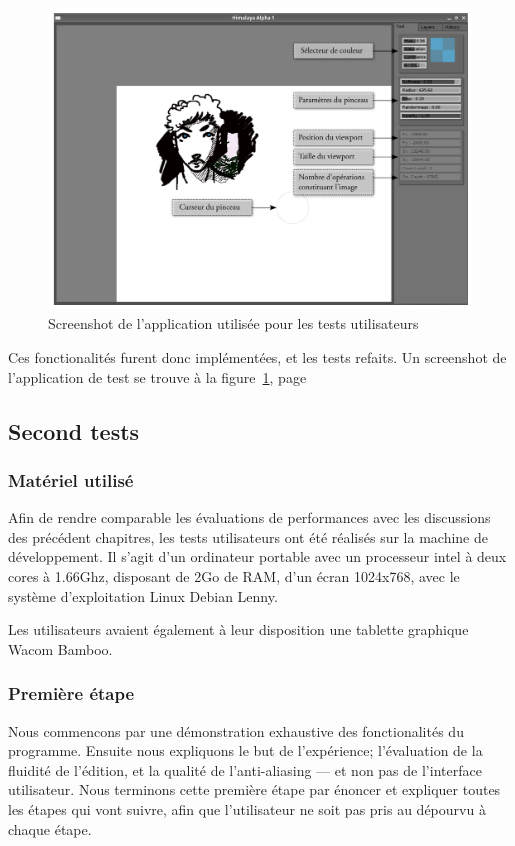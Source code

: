 		\begin{figure}[ht]
			\centering
			\includegraphics[width=\textwidth]{images/screenshot} 
			\caption{Screenshot de l'application utilisée pour les tests utilisateurs}
			\label{fig:screenshot}
		\end{figure}
		Ces fonctionalités furent donc implémentées, et les tests refaits. Un screenshot de l'application
		de test se trouve à la figure~\ref{fig:screenshot}, page~\pageref{fig:screenshot} 

		\subsection{Second tests}
			\subsubsection{Matériel utilisé}
			Afin de rendre comparable les évaluations de performances avec les discussions des
			précédent chapitres, les tests utilisateurs ont été réalisés sur la machine de développement.
			Il s'agit d'un ordinateur portable avec un processeur intel à deux cores à 1.66Ghz, disposant
			de 2Go de RAM, d'un écran 1024x768, avec le système d'exploitation Linux Debian Lenny.

			Les utilisateurs avaient également à leur disposition une tablette graphique Wacom Bamboo.

			\subsubsection{Première étape}
			Nous commencons par une démonstration exhaustive des fonctionalités du programme.
			Ensuite nous expliquons le but de l'expérience; l'évaluation de la fluidité de
			l'édition, et la qualité de l'anti-aliasing --- et non pas de l'interface utilisateur.
			Nous terminons cette première étape par énoncer et expliquer toutes les étapes qui vont suivre,
			afin que l'utilisateur ne soit pas pris au dépourvu à chaque étape.

